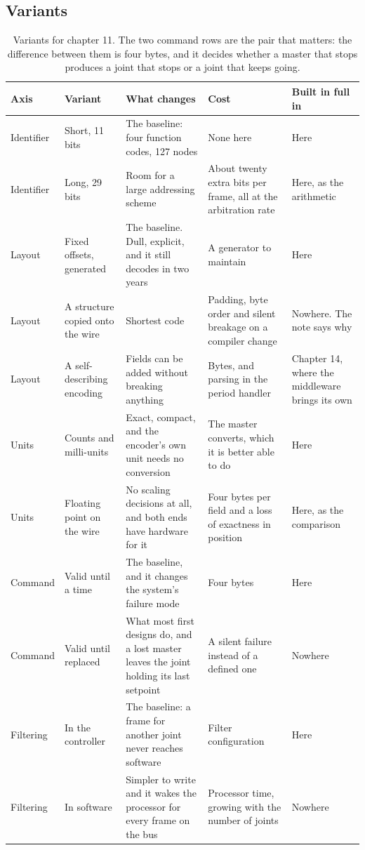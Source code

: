 \subsection*{Variants}

\begin{table}[H]\centering\small
\begin{tabular}{p{24mm}p{26mm}p{44mm}p{22mm}p{20mm}}
\toprule
Axis & Variant & What changes & Cost & Built in full in \\
\midrule
Identifier & Short, 11 bits & The baseline: four function codes, 127 nodes & None here & Here \\
Identifier & Long, 29 bits & Room for a large addressing scheme & About twenty extra bits per frame, all at the arbitration rate & Here, as the arithmetic \\
Layout & Fixed offsets, generated & The baseline. Dull, explicit, and it still decodes in two years & A generator to maintain & Here \\
Layout & A structure copied onto the wire & Shortest code & Padding, byte order and silent breakage on a compiler change & Nowhere. The note says why \\
Layout & A self-describing encoding & Fields can be added without breaking anything & Bytes, and parsing in the period handler & Chapter 14, where the middleware brings its own \\
Units & Counts and milli-units & Exact, compact, and the encoder's own unit needs no conversion & The master converts, which it is better able to do & Here \\
Units & Floating point on the wire & No scaling decisions at all, and both ends have hardware for it & Four bytes per field and a loss of exactness in position & Here, as the comparison \\
Command & Valid until a time & The baseline, and it changes the system's failure mode & Four bytes & Here \\
Command & Valid until replaced & What most first designs do, and a lost master leaves the joint holding its last setpoint & A silent failure instead of a defined one & Nowhere \\
Filtering & In the controller & The baseline: a frame for another joint never reaches software & Filter configuration & Here \\
Filtering & In software & Simpler to write and it wakes the processor for every frame on the bus & Processor time, growing with the number of joints & Nowhere \\
\bottomrule
\end{tabular}
\caption{Variants for chapter 11. The two command rows are the pair that matters: the difference between them is four bytes, and it decides whether a master that stops produces a joint that stops or a joint that keeps going.}
\end{table}

